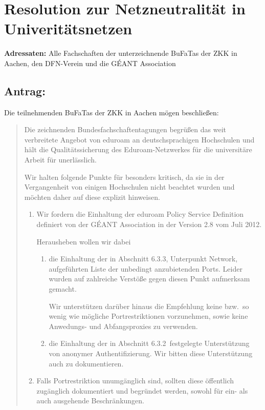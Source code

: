 \documentclass[12pt,oneside]{scrartcl}
\begin{document}
\section*{Resolution zur Netzneutralität in Univeritätsnetzen}

\textbf{Adressaten:} Alle Fachschaften der unterzeichnende BuFaTas der ZKK in
Aachen, den DFN-Verein und die GÉANT Association

\subsection*{Antrag:}
Die teilnehmenden BuFaTas der ZKK in Aachen mögen beschließen:
\begin{quote}
  Die zeichnenden Bundesfachschaftentagungen begrüßen das weit verbreitete
  Angebot von eduroam an deutschsprachigen Hochschulen und hält die
  Qualitätssicherung des Eduroam-Netzwerkes für die universitäre Arbeit für
  unerlässlich.

  Wir halten folgende Punkte für besonders kritisch, da sie in der Vergangenheit
  von einigen Hochschulen nicht beachtet wurden und möchten daher auf diese
  explizit hinweisen.

  \begin{enumerate}
  \item Wir fordern die Einhaltung der eduroam Policy Service Definition
    definiert von der GÉANT Association in der Version 2.8 vom Juli 2012.

    Herausheben wollen wir dabei
    \begin{enumerate}
    \item  die Einhaltung der in Abschnitt 6.3.3, Unterpunkt Network,
      aufgeführten Liste der unbedingt anzubietenden Ports. Leider wurden auf
      zahlreiche Verstöße gegen diesen Punkt aufmerksam gemacht.

      Wir unterstützen darüber hinaus die Empfehlung keine
      bzw.\ so wenig wie mögliche Portrestriktionen vorzunehmen, sowie keine
      Anwedungs- und Abfangsproxies zu verwenden.

    \item die Einhaltung der in Abschnitt 6.3.2\ festgelegte Unterstützung von
      anonymer Authentifizierung. Wir bitten diese Unterstützung auch zu
      dokumentieren.
    \end{enumerate}
  \item Falls Portrestriktion unumgänglich sind, sollten diese öffentlich
    zugänglich dokumentiert und begründet werden, sowohl für ein- als auch
    ausgehende Beschränkungen.


\end{enumerate}
\end{quote}
\end{document}
